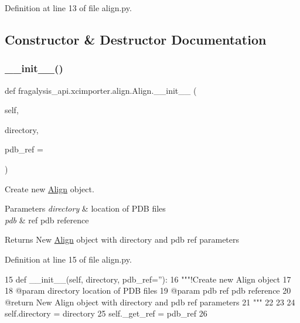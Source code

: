 Definition at line 13 of file align.\+py.



\subsection{Constructor \& Destructor Documentation}
\mbox{\label{classfragalysis__api_1_1xcimporter_1_1align_1_1_align_a28e5edc1a05680d36665012eff20a271}} 
\subsubsection{\texorpdfstring{\+\_\+\+\_\+init\+\_\+\+\_\+()}{\_\_init\_\_()}}
{\footnotesize\ttfamily def fragalysis\+\_\+api.\+xcimporter.\+align.\+Align.\+\_\+\+\_\+init\+\_\+\+\_\+ (\begin{DoxyParamCaption}\item[{}]{self,  }\item[{}]{directory,  }\item[{}]{pdb\+\_\+ref = {\ttfamily \textquotesingle{}\textquotesingle{}} }\end{DoxyParamCaption})}



Create new \hyperlink{classfragalysis__api_1_1xcimporter_1_1align_1_1_align}{Align} object. 


\begin{DoxyParams}{Parameters}
{\em directory} & location of P\+DB files \\
\hline
{\em pdb} & ref pdb reference \\
\hline
\end{DoxyParams}
\begin{DoxyReturn}{Returns}
New \hyperlink{classfragalysis__api_1_1xcimporter_1_1align_1_1_align}{Align} object with directory and pdb ref parameters 
\end{DoxyReturn}


Definition at line 15 of file align.\+py.


\begin{DoxyCode}
15     \textcolor{keyword}{def }\_\_init\_\_(self, directory, pdb\_ref=''):
16         \textcolor{stringliteral}{"""!Create new Align object}
17 \textcolor{stringliteral}{}
18 \textcolor{stringliteral}{        @param directory location of PDB files}
19 \textcolor{stringliteral}{        @param pdb ref pdb reference}
20 \textcolor{stringliteral}{        @return New Align object with directory and pdb ref parameters}
21 \textcolor{stringliteral}{        """}
22 
23 
24         self.directory = directory
25         self.\_get\_ref = pdb\_ref
26 
\end{DoxyCode}


